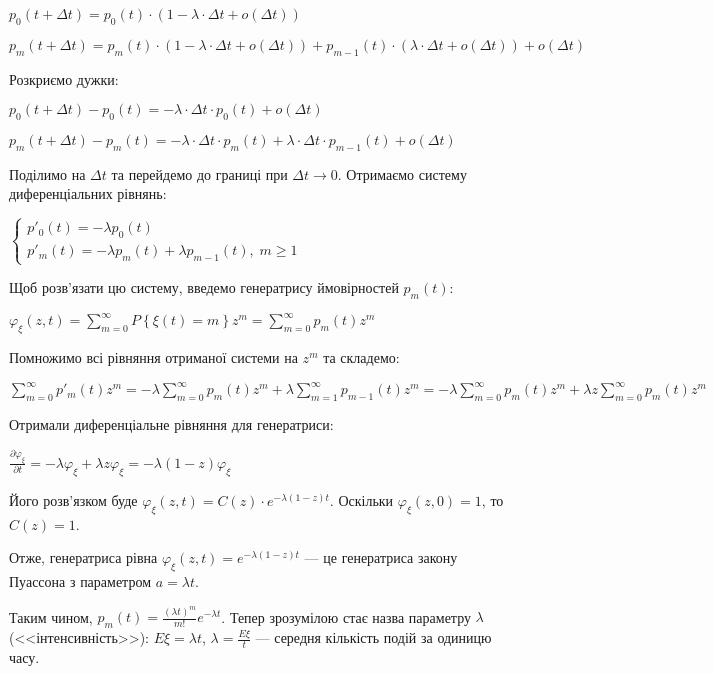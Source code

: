 $p_0(t+\Delta t) = p_0(t) \cdot (1 - \lambda \cdot \Delta t + o(\Delta t))$

$p_m(t+\Delta t) = p_m(t) \cdot (1 - \lambda \cdot \Delta t + o(\Delta t)) + p_{m-1}(t) \cdot (\lambda \cdot \Delta t + o(\Delta t)) + o(\Delta t)$

\noindent Розкриємо дужки:

$p_0(t+\Delta t) - p_0(t) = -\lambda \cdot \Delta t \cdot p_0(t) + o(\Delta t)$
\nopagebreak

$p_m(t+\Delta t) - p_m(t) = -\lambda \cdot \Delta t \cdot p_m(t) + \lambda\cdot\Delta t \cdot p_{m-1}(t) + o(\Delta t)$

\noindent Поділимо на $\Delta t$ та перейдемо до границі при $\Delta t \rightarrow 0$.
Отримаємо систему диференціальних рівнянь:

$\begin{cases}
    p'_0(t) = - \lambda p_0(t) \\
    p'_m(t) = - \lambda p_m(t) + \lambda p_{m-1}(t), \; m \geq 1
\end{cases}$

\noindent Щоб розв'язати цю систему, введемо генератрису ймовірностей $p_m(t)$:

$\varphi_\xi(z, t) = \sum\limits_{m=0}^{\infty} P\left\{\xi(t) = m\right\} z^m = \sum\limits_{m=0}^{\infty} p_m(t) z^m$ 

\noindent Помножимо всі рівняння отриманої системи на $z^m$ та складемо:

$\sum\limits_{m=0}^{\infty} p'_m(t) z^m = -\lambda \sum\limits_{m=0}^{\infty} p_m(t) z^m + \lambda \sum\limits_{m=1}^{\infty} p_{m-1}(t) z^m = 
-\lambda \sum\limits_{m=0}^{\infty} p_m(t) z^m + \lambda z \sum\limits_{m=0}^{\infty} p_{m}(t) z^m$

\noindent Отримали диференціальне рівняння для генератриси:

$\frac{\partial \varphi_\xi}{\partial t} = - \lambda \varphi_\xi + \lambda z \varphi_\xi = -\lambda(1-z) \varphi_\xi$

\noindent Його розв'язком буде $\varphi_\xi(z, t) = C(z) \cdot e^{-\lambda(1-z)t}$.
Оскільки $\varphi_\xi(z, 0) = 1$, то $C(z) = 1$.

Отже, генератриса рівна $\varphi_\xi(z, t) = e^{-\lambda(1-z)t}$ --- це генератриса закону Пуассона з параметром $a=\lambda t$.

Таким чином, $p_m(t) = \frac{(\lambda t)^m}{m!}e^{-\lambda t}$. 
Тепер зрозумілою стає назва параметру $\lambda$ (<<інтенсивність>>): $E\xi = \lambda t$, $\lambda = \frac{E\xi}{t}$ --- середня кількість подій за одиницю часу.